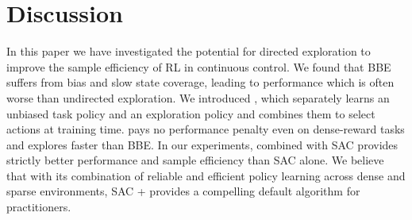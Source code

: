 \section{Discussion}
In this paper we have investigated the potential for directed exploration to improve the sample efficiency of RL in continuous control.
We found that BBE suffers from bias and slow state coverage, leading to performance which is often worse than undirected exploration.
We introduced \algname{}, which separately learns an unbiased task policy and an exploration policy and combines them to select actions at training time.
\algshort{} pays no performance penalty even on dense-reward tasks and explores faster than BBE.
In our experiments, \algshort{} combined with SAC provides strictly better performance and sample efficiency than SAC alone.
We believe that with its combination of reliable and efficient policy learning across dense and sparse environments, SAC + \algshort{} provides a compelling default algorithm for practitioners.


\printendnotes